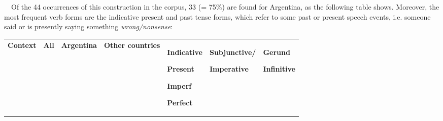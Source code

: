 \begin{styleStandard}
\ \ Of the 44 occurrences of this construction in the corpus, 33 (= 75\%) are found for Argentina, as the following table shows. Moreover, the most frequent verb forms are the indicative present and past tense forms, which refer to some past or present speech events, i.e. someone said or is presently saying something \textit{wrong/nonsense}:
\end{styleStandard}

\begin{center}
\tablefirsthead{}
\tablehead{}
\tabletail{}
\tablelasttail{}
\begin{supertabular}{|m{1.2983599in}|m{0.41085985in}|m{0.6101598in}|m{0.70945984in}|m{0.6101598in}|m{0.8073598in}|m{0.6295598in}|}
\hline
\centering \textbf{Context} &
\centering \textbf{All} &
\centering \textbf{Argentina} &
\centering \textbf{Other countries} &
{\centering \textbf{Indicative}\par}

{\centering \textbf{Present}\par}

{\centering \textbf{Imperf}\par}

\centering \textbf{Perfect} &
{\centering \textbf{Subjunctive/}\par}

\centering \textbf{Imperative} &
{\centering \textbf{Gerund}\par}

{\centering \textbf{Infinitive}\par}


\end{supertabular}
\end{center}
